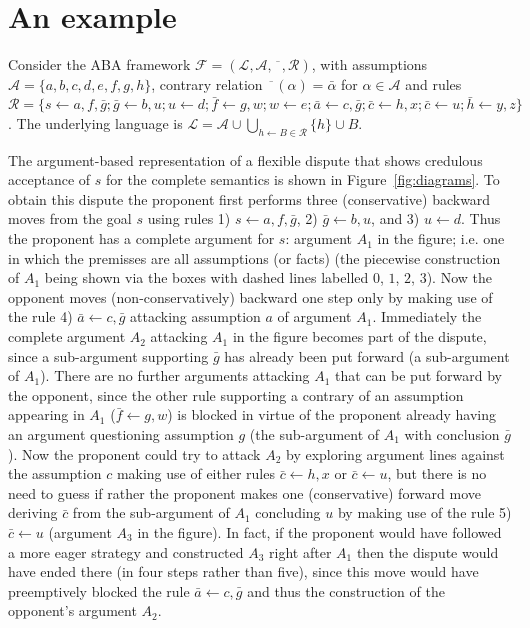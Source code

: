 \documentclass[conference]{IEEEtran}
\newtheorem{example}{Example}[section]
\newcommand{\frF}{\ensuremath{\mathcal{F}}\xspace}
\newcommand{\frL}{\ensuremath{\mathcal{L}}\xspace}
\newcommand{\frA}{\ensuremath{\mathcal{A}}\xspace}
\newcommand{\frCtr}{\ensuremath{\overline{\phantom{x}}}\xspace}
\newcommand{\frR}{\ensuremath{\mathcal{R}}\xspace}
\newcommand{\frTup}{\ensuremath{(\frL,\frA,\frCtr,\frR)}\xspace}
\newcommand{\fr}{\ensuremath{\frF = \frTup}\xspace}
\newcommand{\rulH}{\ensuremath{h}\xspace}
\newcommand{\rulB}{\ensuremath{B}\xspace}
\newcommand{\rul}{\ensuremath{\rulH \leftarrow \rulB}\xspace}
\newcommand{\rulA}[2]{\ensuremath{#1 \leftarrow #2}\xspace}
\begin{document}
\section{An example}



Consider the ABA framework \fr, with assumptions $\frA = \{ a,b,c,d,e,f,g,h \}$, contrary relation $\frCtr(\alpha) = \bar{\alpha}$ for $\alpha \in \frA$ and rules $\frR = \{ \rulA{s}{a,f,\bar{g}}; \rulA{\bar{g}}{b,u}; \rulA{u}{d}; \rulA{\bar{f}}{g,w}; \rulA{w}{e};\rulA{\bar{a}}{c,\bar{g}};\rulA{\bar{c}}{h,x};\rulA{\bar{c}}{u};\rulA{\bar{h}}{y,z} \}$.  The underlying language is $\frL = \frA \cup \bigcup_{\rul \in \frR} \{ \rulH \} \cup \rulB$. 

The argument-based representation of a flexible dispute that shows credulous acceptance of $s$ for the complete semantics is shown in Figure~\ref{fig:diagrams}. To obtain this dispute the proponent first performs three (conservative) backward moves from the goal $s$ using rules 1) $\rulA{s}{a,f,\bar{g}}$, 2) $\rulA{\bar{g}}{b,u}$, and  3) $\rulA{u}{d}$. Thus the proponent has a complete argument for $s$: argument $A_1$ in the figure; i.e. one in which the premisses are all assumptions (or facts) (the piecewise construction of $A_1$ being shown via the boxes with dashed lines labelled $0$, $1$, $2$, $3$).  Now the opponent moves (non-conservatively) backward one step only by making use of the rule 4) $\rulA{\bar{a}}{c,\bar{g}}$ attacking assumption $a$ of argument $A_1$.  Immediately the complete argument $A_2$ attacking $A_1$ in the figure becomes part of the dispute, since a sub-argument supporting $\bar{g}$ has already been put forward (a sub-argument of $A_1$).  There are no further arguments attacking $A_1$ that can be put forward by the opponent, since the other rule supporting a contrary of an assumption appearing in $A_1$ ($\rulA{\bar{f}}{g,w}$) is blocked in virtue of the proponent already having an argument questioning assumption $g$ (the sub-argument of $A_1$ with conclusion $\bar{g}$).  Now the proponent could try to attack $A_2$ by exploring argument lines against the assumption $c$ making use of either rules $\rulA{\bar{c}}{h,x}$ or $\rulA{\bar{c}}{u}$, but there is no need to guess if rather the proponent makes one (conservative) forward move deriving $\bar{c}$ from the sub-argument of $A_1$ concluding $u$ by making use of the rule 5) $\rulA{\bar{c}}{u}$ (argument $A_3$ in the figure). In fact, if the proponent would have followed a more eager strategy and constructed $A_3$ right after $A_1$ then the dispute would have ended there (in four steps rather than five), since this move would have preemptively blocked the rule $\rulA{\bar{a}}{c,\bar{g}}$ and thus the construction of the opponent's argument $A_2$.   
\end{document}
